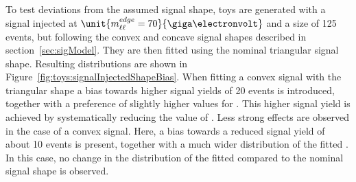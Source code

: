 To test deviations from the assumed signal shape, toys are generated with a signal injected at $\unit{\mlledge = 70}{\giga\electronvolt}$ and a size of 125 events, but following the convex and concave signal shapes described in section~\ref{sec:sigModel}. They are then fitted using the nominal triangular signal shape. Resulting distributions are shown in Figure~\ref{fig:toys:signalInjectedShapeBias}. When fitting a convex signal with the triangular shape a bias towards higher signal yields of 20 events is introduced, together with a preference of slightly higher values for \mlledge. This higher signal yield is achieved by systematically reducing the value of \Rsfof. Less strong effects are observed in the case of a convex signal. Here, a bias towards a reduced signal yield of about 10 events is present, together with a much wider distribution of the fitted \mlledge. In this case, no change in the distribution of the fitted \Rsfof compared to the nominal signal shape is observed. 

